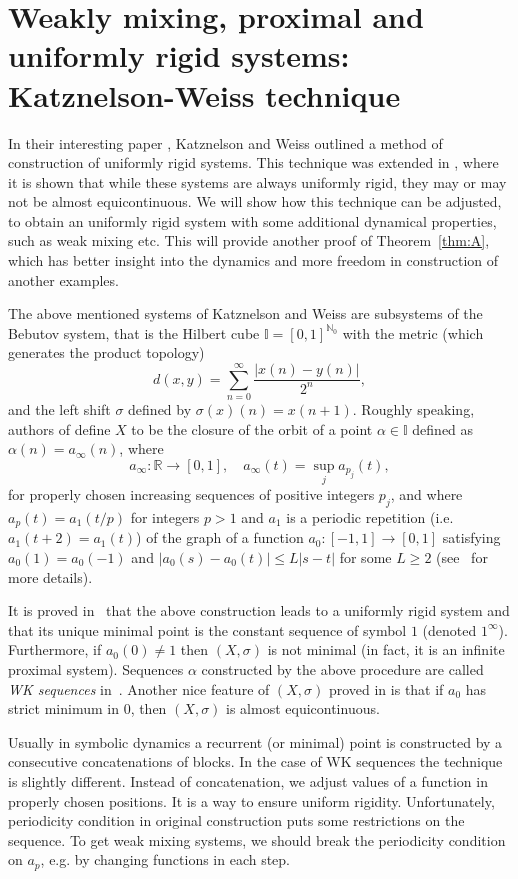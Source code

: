 \documentclass[reqno,a4paper,12pt]{amsart}
\theoremstyle{definition}
\numberwithin{equation}{section}
\begin{document}
\section{Weakly mixing, proximal and uniformly rigid systems: Katznelson-Weiss technique}

In their interesting paper \cite{KW}, Katznelson and Weiss outlined a method of construction
of uniformly rigid systems. This technique was extended in \cite{AAB}, where it is shown that while
these systems are always uniformly rigid, they may or may not be almost equicontinuous.
We will show how this technique can be adjusted, to obtain an uniformly rigid system
with some additional dynamical properties, such
as weak mixing etc. This will provide another proof of Theorem~\ref{thm:A}, which has better insight into the dynamics and more freedom in construction of another examples.

The above mentioned systems of Katznelson and Weiss are subsystems of the Bebutov system, that is the Hilbert cube $\mathbb{I}=[0,1]^{{\mathbb{N}}_0}$ with the metric (which generates the product topology)
$$
d(x,y) = \sum_{n=0}^{\infty}\frac{|x(n)-y(n)|}{2^n},
$$
and the left shift $\sigma$ defined by $\sigma(x)(n)=x(n+1)$.
Roughly speaking, authors of \cite{KW} define $X$ to be the closure of the orbit of a point $\alpha\in \mathbb{I}$ defined as $\alpha(n)=a_\infty(n)$,
where
$$
a_\infty\colon {\mathbb{R}} \to [0,1], \quad a_\infty(t)=\sup_{j}a_{p_j}(t),
$$
for properly chosen increasing sequences of positive integers $p_j$, and where
$a_p(t)=a_1(t/p)$ for integers $p>1$ and $a_1$
is a periodic repetition (i.e. $a_1(t+2)=a_1(t)$) of the graph of a function $a_0\colon [-1,1]\to [0,1]$ satisfying $a_0(1)=a_0(-1)$ and $|a_0(s)-a_0(t)|\leq L|s-t|$
for some $L\geq 2$ (see~\cite{AAB} for more details).

It is proved in~\cite{AAB} that the above construction leads to a uniformly rigid system
and that its unique minimal point is the constant sequence of symbol $1$ (denoted $1^\infty$).
Furthermore, if $a_0(0)\neq 1$ then $(X,\sigma)$ is not minimal (in fact, it is an infinite proximal system).
Sequences $\alpha$ constructed by the above procedure are called \emph{WK sequences} in~\cite{AAB}.
Another nice feature of $(X,\sigma)$ proved in \cite{AAB} is that if $a_0$ has strict minimum in $0$,
then $(X,\sigma)$ is almost equicontinuous.

Usually in symbolic dynamics a recurrent (or minimal) point is constructed by a consecutive concatenations of blocks. In the case of WK sequences the technique is
slightly different. Instead of concatenation, we adjust values of a function in properly chosen positions. It is a way to ensure uniform rigidity.
Unfortunately, periodicity condition in original construction puts some restrictions on the sequence.
To get weak mixing systems, we should break the periodicity condition on $a_p$, e.g. by changing functions in each step.
\end{document}
